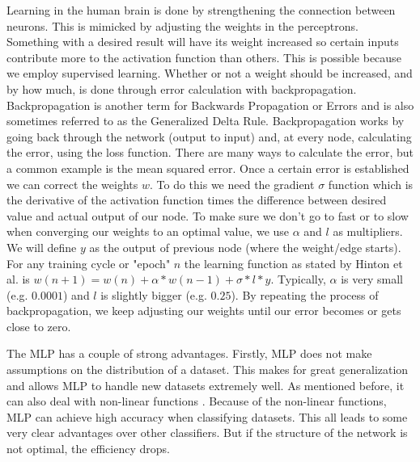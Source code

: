 Learning in the human brain is done by strengthening the connection between neurons. This is mimicked by adjusting the weights in the perceptrons. Something with a desired result will have its weight increased so certain inputs contribute more to the activation function than others. This is possible because we employ supervised learning. Whether or not a weight should be increased, and by how much, is done through error calculation with backpropagation. Backpropagation is another term for Backwards Propagation or Errors \cite{rumelhart1985learning} and is also sometimes referred to as the Generalized Delta Rule. Backpropagation works by going back through the network (output to input) and, at every node, calculating the error, using the loss function. There are many ways to calculate the error, but a common example is the mean squared error. Once a certain error is established we can correct the weights $w$. To do this we need the gradient $\sigma$ function which is the derivative of the activation function times the difference between desired value and actual output of our node. To make sure we don't go to fast or to slow when converging our weights to an optimal value, we use $\alpha$ and $l$ as multipliers. We will define $y$ as the output of previous node (where the weight/edge starts). For any training cycle or "epoch" $n$ the learning function as stated by Hinton et al. is $w(n+1)=w(n) + \alpha * w(n-1) + \sigma * l * y$. Typically, $\alpha$ is very small (e.g. $0.0001$) and $l$ is slightly bigger (e.g. $0.25$). By repeating the process of backpropagation, we keep adjusting our weights until our error becomes or gets close to zero.

The MLP has a couple of strong advantages. Firstly, MLP does not make assumptions on the distribution of a dataset. This makes for great generalization and allows MLP to handle new datasets extremely well. As mentioned before, it can also deal with non-linear functions \cite{gardner1998artificial}. Because of the non-linear functions, MLP can achieve high accuracy when classifying datasets. This all leads to some very clear advantages over other classifiers. But if the structure of the network is not optimal, the efficiency drops.